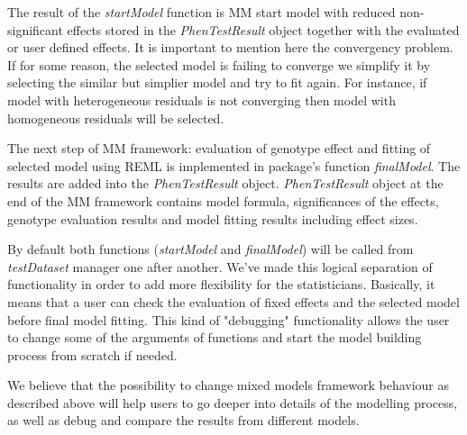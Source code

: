 \documentclass[12pt,a4paper]{article}
\begin{document}
The result of the \textit{startModel} function is MM start model with reduced non-significant effects stored in the \textit{PhenTestResult} object together with the evaluated or user defined effects.
It is important to mention here the convergency problem. If for some reason, the selected model is failing to converge we simplify it by selecting the similar but simplier model and try to fit again. 
For instance, if model with heterogeneous residuals is not converging then model with homogeneous residuals will be selected.

The next step of MM framework: evaluation of genotype effect and fitting of selected model using REML is implemented in package's function \textit{finalModel}. 
The results are added into the \textit{PhenTestResult} object.  \textit{PhenTestResult} object at the end of the MM framework contains model formula, significances of the effects, genotype evaluation results and model fitting results including effect sizes.

By default both functions (\textit{startModel} and \textit{finalModel}) will be called from \textit{testDataset} manager one after another. 
We've made this logical separation of functionality in order to add more flexibility for the statisticians. 
Basically, it means that a user can check the evaluation of fixed effects and the selected model before final model fitting. 
This kind of "debugging" functionality allows the user to change some of the arguments of functions and start the model building process from scratch if needed.

We believe that the possibility to change mixed models framework behaviour as described above will help users to go deeper into details of the modelling process, 
as well as debug and compare the results from different models. 
\end{document}

